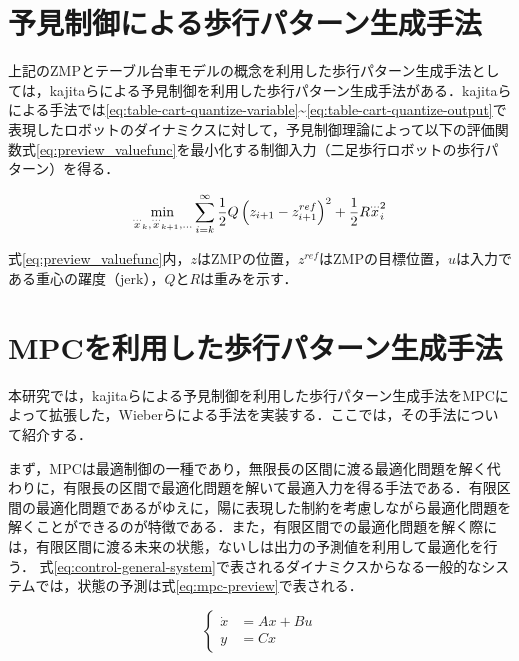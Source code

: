 \newpage

\section{予見制御による歩行パターン生成手法}
上記のZMPとテーブル台車モデルの概念を利用した歩行パターン生成手法としては，kajitaらによる予見制御を利用した歩行パターン生成手法\cite{PREVIEW}がある．kajitaらによる手法では\eqref{eq:table-cart-quantize-variable}\textasciitilde\eqref{eq:table-cart-quantize-output}で表現したロボットのダイナミクスに対して，予見制御理論によって以下の評価関数式\eqref{eq:preview_valuefunc}を最小化する制御入力（二足歩行ロボットの歩行パターン）を得る．

\begin{equation}
  \min_{{\buildrel\ldots\over{x}}_{k},{\buildrel\ldots\over{x}}_{k+1},\ldots}\sum_{i=k}^{\infty}{1\over 2}Q\left(z_{i+1}-z_{i+1}^{ref}\right)^{2}+{1\over 2}R{\buildrel\ldots\over{x}}_{i}^{2}
  \label{eq:preview_valuefunc}
\end{equation}

式\eqref{eq:preview_valuefunc}内，$z$はZMPの位置，$z^{ref}$はZMPの目標位置，$u$は入力である重心の躍度（jerk），$Q$と$R$は重みを示す．

\section{MPCを利用した歩行パターン生成手法}
本研究では，kajitaらによる予見制御を利用した歩行パターン生成手法\cite{PREVIEW}をMPCによって拡張した，Wieberらによる手法\cite{WIEBER}を実装する．ここでは，その手法\cite{WIEBER}について紹介する．

まず，MPCは最適制御の一種であり，無限長の区間に渡る最適化問題を解く代わりに，有限長の区間で最適化問題を解いて最適入力を得る手法である．有限区間の最適化問題であるがゆえに，陽に表現した制約を考慮しながら最適化問題を解くことができるのが特徴である．また，有限区間での最適化問題を解く際には，有限区間に渡る未来の状態，ないしは出力の予測値を利用して最適化を行う．
式\eqref{eq:control-general-system}で表されるダイナミクスからなる一般的なシステムでは，状態の予測は式\eqref{eq:mpc-preview}で表される．

\begin{equation}
  \begin{cases}
    \dot{x} & = Ax + Bu \\
    y       & = Cx
  \end{cases}
  \label{eq:control-general-system}
\end{equation}

